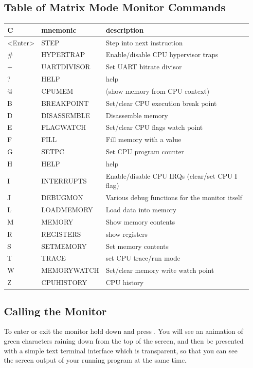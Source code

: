 \subsection{Table of Matrix Mode Monitor Commands}

{
\ttfamily
\setlength{\tabcolsep}{1mm}
\begin{center}
\begin{tabular}{|l|l|l|}
\hline
C & mnemonic & description \\
\hline
<Enter> & STEP & Step into next instruction \\
\# & HYPERTRAP & Enable/disable CPU hypervisor traps \\
+ & UARTDIVISOR & Set UART bitrate divisor \\
? & HELP & help \\
@ & CPUMEM & (show memory from CPU context) \\
\hline
B & BREAKPOINT & Set/clear CPU execution break point \\
D & DISASSEMBLE & Disassemble memory \\
E & FLAGWATCH & Set/clear CPU flags watch point \\
F & FILL & Fill memory with a value \\
G & SETPC & Set CPU program counter \\
H & HELP & help \\
I & INTERRUPTS & Enable/disable CPU IRQs (clear/set CPU I flag) \\
J & DEBUGMON & Various debug functions for the monitor itself \\
L & LOADMEMORY & Load data into memory \\
M & MEMORY & Show memory contents \\
R & REGISTERS & show registers \\
S & SETMEMORY & Set memory contents \\
T & TRACE & set CPU trace/run mode \\
W & MEMORYWATCH & Set/clear memory write watch point \\
Z & CPUHISTORY & CPU history \\
\hline
\end{tabular}
\end{center}
}

\subsection {Calling the Monitor}

To enter or exit the monitor hold down \megasymbolkey and press .
You will see an animation of green characters raining down from the top of the screen, and
then be presented with a simple text terminal interface which is transparent, so that you can
see the screen output of your running program at the same time.

